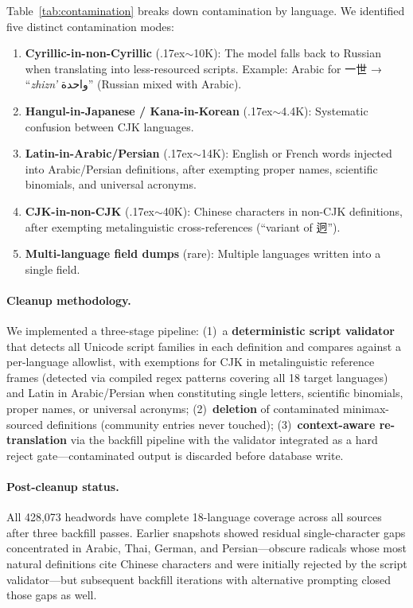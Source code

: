 \documentclass[11pt]{article}
\begin{document}
Table~\ref{tab:contamination} breaks down contamination by language. We identified five distinct contamination modes:

\begin{enumerate}
\item \textbf{Cyrillic-in-non-Cyrillic} ({\raise.17ex\hbox{$\scriptstyle\sim$}}10K): The model falls back to Russian when translating into less-resourced scripts. Example: Arabic for 一世 → ``\textit{zhizn'} \foreignlanguage{arabic}{واحدة}'' (Russian mixed with Arabic).
\item \textbf{Hangul-in-Japanese / Kana-in-Korean} ({\raise.17ex\hbox{$\scriptstyle\sim$}}4.4K): Systematic confusion between CJK languages.
\item \textbf{Latin-in-Arabic/Persian} ({\raise.17ex\hbox{$\scriptstyle\sim$}}14K): English or French words injected into Arabic/Persian definitions, after exempting proper names, scientific binomials, and universal acronyms.
\item \textbf{CJK-in-non-CJK} ({\raise.17ex\hbox{$\scriptstyle\sim$}}40K): Chinese characters in non-CJK definitions, after exempting metalinguistic cross-references (``variant of 迥'').
\item \textbf{Multi-language field dumps} (rare): Multiple languages written into a single field.
\end{enumerate}

\paragraph{Cleanup methodology.} We implemented a three-stage pipeline: (1)~a \textbf{deterministic script validator} that detects all Unicode script families in each definition and compares against a per-language allowlist, with exemptions for CJK in metalinguistic reference frames (detected via compiled regex patterns covering all 18 target languages) and Latin in Arabic/Persian when constituting single letters, scientific binomials, proper names, or universal acronyms; (2)~\textbf{deletion} of contaminated minimax-sourced definitions (community entries never touched); (3)~\textbf{context-aware re-translation} via the backfill pipeline with the validator integrated as a hard reject gate---contaminated output is discarded before database write.

\paragraph{Post-cleanup status.} All 428,073 headwords have complete 18-language coverage across all sources after three backfill passes. Earlier snapshots showed residual single-character gaps concentrated in Arabic, Thai, German, and Persian---obscure radicals whose most natural definitions cite Chinese characters and were initially rejected by the script validator---but subsequent backfill iterations with alternative prompting closed those gaps as well.
\end{document}

